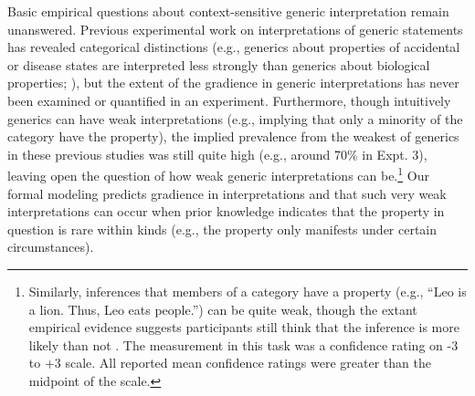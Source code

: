 \documentclass[floatsintext,doc]{apa6}
\let\rmarkdownfootnote\footnote%
\def\footnote{\protect\rmarkdownfootnote}
\newcommand{\mht}[1]{{\textcolor{Blue}{[mht: #1]}}}
\begin{document}



Basic empirical questions about context-sensitive generic interpretation remain unanswered.
Previous experimental work on interpretations of generic statements has revealed categorical distinctions (e.g., generics about properties of accidental or disease states are interpreted less strongly than generics about biological properties; ), but the extent of the gradience in generic interpretations has never been examined or quantified in an experiment. 
Furthermore, though intuitively generics can have weak interpretations (e.g., implying that only a minority of the category have the property), the implied prevalence from the weakest of generics in these previous studies was still quite high (e.g., around 70\% in  Expt. 3), leaving open the question of how weak generic interpretations can be.\footnote{Similarly, inferences that members of a category have a property (e.g., \enquote{Leo is a lion. Thus, Leo eats people.}) can be quite weak, though the extant empirical evidence suggests participants still think that the inference is more likely than not \cite{Khemlani2012}. The measurement in this task was a confidence rating on -3 to +3 scale. All reported mean confidence ratings were greater than the midpoint of the scale.}
Our formal modeling predicts gradience in interpretations and that such very weak interpretations can occur when prior knowledge indicates that the property in question is rare within kinds (e.g., the property only manifests under certain circumstances).
\end{document}
